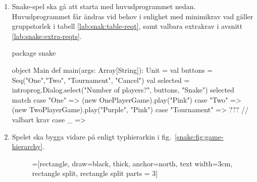 \begin{enumerate}[label={$\square$}, leftmargin=*]

\item Snake-spel ska gå att starta med huvudprogrammet nedan. Huvudprogrammet får ändras vid behov i enlighet med minimikrav vad gäller gruppstorlek i tabell \ref{lab:snak:table-reqt}, samt valbara extrakrav i avsnitt \ref{lab:snake:extra-reqts}.
\begin{Code}
package snake

object Main {
  def main(args: Array[String]): Unit = {
    val buttons = Seq("One","Two", "Tournament", "Cancel")
    val selected =
      introprog.Dialog.select("Number of players?", buttons, "Snake")
    selected match {
      case "One" => (new OnePlayerGame).play("Pink")
      case "Two" => (new TwoPlayerGame).play("Purple", "Pink")
      case "Tournament" => ??? // valbart krav
      case _ =>
    }
  }
}
\end{Code}

\item Spelet ska bygga vidare på  enligt typhierarkin i fig.~\ref{snake:fig:game-hierarchy}.

\begin{figure}[H]
\begin{center}
\newcommand{\TextBox}[1]{\raisebox{0pt}[1em][0.5em]{#1}}
=[rectangle, draw=black,  thick, anchor=north, text width=3cm, rectangle split, rectangle split parts = 3]
\end{center}
\end{figure}
\end{enumerate}
